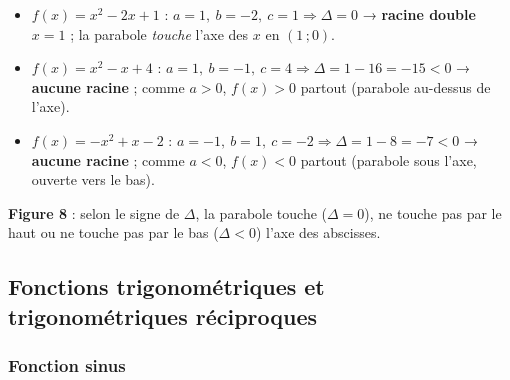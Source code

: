 \documentclass[11pt,a4paper]{article}
\begin{document}
\begin{exemple}
\begin{itemize}[leftmargin=1.5em,topsep=2pt]
  \item $f(x)=x^2-2x+1$ : $a=1,\ b=-2,\ c=1\Rightarrow\Delta=0$ → \textbf{racine double}
        $x=1$ ; la parabole \emph{touche} l'axe des $x$ en $(1\,;0)$.
  \item $f(x)=x^2-x+4$ : $a=1,\ b=-1,\ c=4\Rightarrow\Delta=1-16=-15<0$ → \textbf{aucune
        racine} ; comme $a>0$, $f(x)>0$ partout (parabole au-dessus de l'axe).
  \item $f(x)=-x^2+x-2$ : $a=-1,\ b=1,\ c=-2\Rightarrow\Delta=1-8=-7<0$ → \textbf{aucune
        racine} ; comme $a<0$, $f(x)<0$ partout (parabole sous l'axe, ouverte vers le bas).
\end{itemize}
\end{exemple}

\begin{center}
\textbf{\textcolor{primary}{Figure 8}} : selon le signe de $\Delta$, la parabole touche
($\Delta=0$), ne touche pas par le haut ou ne touche pas par le bas ($\Delta<0$) l'axe des abscisses.
\end{center}

\subsection{Fonctions trigonométriques et trigonométriques réciproques}

\subsubsection{Fonction sinus}
\end{document}
